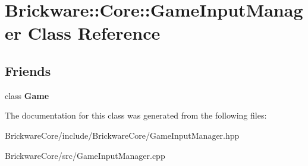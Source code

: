 \hypertarget{classBrickware_1_1Core_1_1GameInputManager}{}\section{Brickware\+:\+:Core\+:\+:Game\+Input\+Manager Class Reference}
\label{classBrickware_1_1Core_1_1GameInputManager}
\subsection*{Friends}
\begin{DoxyCompactItemize}
\item 
\hypertarget{classBrickware_1_1Core_1_1GameInputManager_aa2fab026580d6f14280c2ffb8063a314}{}class {\bfseries Game}\label{classBrickware_1_1Core_1_1GameInputManager_aa2fab026580d6f14280c2ffb8063a314}

\end{DoxyCompactItemize}


The documentation for this class was generated from the following files\+:\begin{DoxyCompactItemize}
\item 
Brickware\+Core/include/\+Brickware\+Core/Game\+Input\+Manager.\+hpp\item 
Brickware\+Core/src/Game\+Input\+Manager.\+cpp\end{DoxyCompactItemize}
